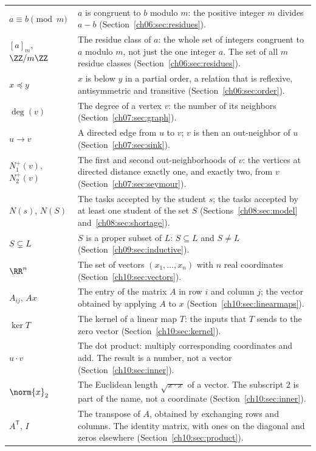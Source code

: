 \begin{longtable}{@{}p{1.25in}p{3.95in}@{}}
$a\equiv b\pmod m$ & $a$ is congruent to $b$ modulo $m$: the positive integer $m$ divides $a-b$ (Section~\ref{ch06:sec:residues}).\\
$[a]_m$, $\ZZ/m\ZZ$ & The residue class of $a$: the whole set of integers congruent to $a$ modulo $m$, not just the one integer $a$. The set of all $m$ residue classes (Section~\ref{ch06:sec:residues}).\\
$x\preceq y$ & $x$ is below $y$ in a partial order, a relation that is reflexive, antisymmetric and transitive (Section~\ref{ch06:sec:order}).\\
$\deg(v)$ & The degree of a vertex $v$: the number of its neighbors (Section~\ref{ch07:sec:graph}).\\
$u\to v$ & A directed edge from $u$ to $v$; $v$ is then an out-neighbor of $u$ (Section~\ref{ch07:sec:sink}).\\
$N_1^+(v)$, $N_2^+(v)$ & The first and second out-neighborhoods of $v$: the vertices at directed distance exactly one, and exactly two, from $v$ (Section~\ref{ch07:sec:seymour}).\\
$N(s)$, $N(S)$ & The tasks accepted by the student $s$; the tasks accepted by at least one student of the set $S$ (Sections~\ref{ch08:sec:model} and~\ref{ch08:sec:shortage}).\\
$S\subsetneq L$ & $S$ is a proper subset of $L$: $S\subseteq L$ and $S\ne L$ (Section~\ref{ch09:sec:inductive}).\\
$\RR^n$ & The set of vectors $(x_1,\ldots,x_n)$ with $n$ real coordinates (Section~\ref{ch10:sec:vectors}).\\
$A_{ij}$, $Ax$ & The entry of the matrix $A$ in row $i$ and column $j$; the vector obtained by applying $A$ to $x$ (Section~\ref{ch10:sec:linearmaps}).\\
$\ker T$ & The kernel of a linear map $T$: the inputs that $T$ sends to the zero vector (Section~\ref{ch10:sec:kernel}).\\
$u\cdot v$ & The dot product: multiply corresponding coordinates and add. The result is a number, not a vector (Section~\ref{ch10:sec:inner}).\\
$\norm{x}_2$ & The Euclidean length $\sqrt{x\cdot x}$ of a vector. The subscript $2$ is part of the name, not a coordinate (Section~\ref{ch10:sec:inner}).\\
$A^{\mathsf T}$, $I$ & The transpose of $A$, obtained by exchanging rows and columns. The identity matrix, with ones on the diagonal and zeros elsewhere (Section~\ref{ch10:sec:product}).\\

\end{longtable}
